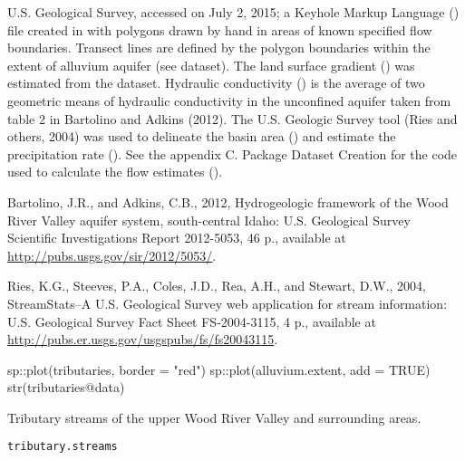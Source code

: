 \documentclass[a4paper]{book}
\begin{document}
%
\begin{Source}\relax
U.S. Geological Survey, accessed on July 2, 2015;
a Keyhole Markup Language () file created in
 with polygons drawn by hand in
areas of known specified flow boundaries.
Transect lines are defined by the polygon boundaries within the extent of
alluvium aquifer (see  dataset).
The land surface gradient () was estimated from the
 dataset.
Hydraulic conductivity () is the average of two geometric means of hydraulic conductivity
in the unconfined aquifer taken from table 2 in Bartolino and Adkins (2012).
The U.S. Geologic Survey  tool
(Ries and others, 2004) was used to delineate the basin area () and
estimate the precipitation rate ().
See the appendix C. Package Dataset Creation for the \R{} code used to calculate the
flow estimates ().
\end{Source}
%
\begin{References}\relax
Bartolino, J.R., and Adkins, C.B., 2012, Hydrogeologic framework of the
Wood River Valley aquifer system, south-central Idaho: U.S. Geological Survey
Scientific Investigations Report 2012-5053, 46 p.,
available at \url{http://pubs.usgs.gov/sir/2012/5053/}.

Ries, K.G., Steeves, P.A., Coles, J.D., Rea, A.H., and Stewart, D.W., 2004,
StreamStats--A U.S. Geological Survey web application for stream information:
U.S. Geological Survey Fact Sheet FS-2004-3115, 4 p., available at
\url{http://pubs.er.usgs.gov/usgspubs/fs/fs20043115}.
\end{References}
%
\begin{Examples}
\begin{ExampleCode}
sp::plot(tributaries, border = "red")
sp::plot(alluvium.extent, add = TRUE)
str(tributaries@data)

\end{ExampleCode}
\end{Examples}
%
\begin{Description}\relax
Tributary streams of the upper Wood River Valley and surrounding areas.
\end{Description}
%
\begin{Usage}
\begin{verbatim}
tributary.streams
\end{verbatim}
\end{Usage}
\end{document}
